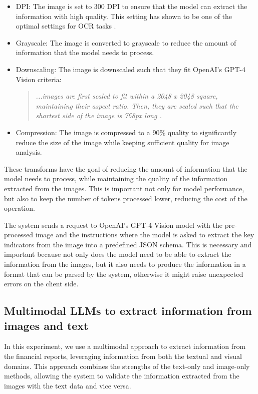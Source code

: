 \documentclass[english, 12pt, a4paper, elec, utf8, a-2b, online]{aaltothesis}
\begin{document}
\begin{itemize}
\label{list:image_transforms}
    \item DPI: The image is set to 300 DPI to ensure that the model can extract the information with high quality. This setting has shown to be one of the optimal settings for \ac{OCR} tasks \cite{ocr_preprocessing2007}.
    \item Grayscale: The image is converted to grayscale to reduce the amount of information that the model needs to process.
    \item Downscaling: The image is downscaled such that they fit OpenAI's \ac{GPT}-4 Vision criteria:
    \begin{quote}
        \textit{...images are first scaled to fit within a 2048 x 2048 square, maintaining their aspect ratio. Then, they are scaled such that the shortest side of the image is 768px long \cite{OpenAIVisionAPI}.}
    \end{quote}
    \item Compression: The image is compressed to a 90\% quality to significantly reduce the size of the image while keeping sufficient quality for image analysis.
\end{itemize}

These transforms have the goal of reducing the amount of information that the model needs to process, while maintaining the quality of the information extracted from the images.
This is important not only for model performance, but also to keep the number of tokens processed lower, reducing the cost of the operation.

The system sends a request to OpenAI's \ac{GPT}-4 Vision model with the pre-processed image and the instructions where the model is asked to extract the key indicators from the image into a predefined JSON schema.
This is necessary and important because not only does the model need to be able to extract the information from the images, but it also needs to produce the information in a format that can be parsed by the system, otherwise it might raise unexpected errors on the client side.

\subsection{Multimodal \ac{LLM}s to extract information from images and text}

In this experiment, we use a multimodal approach to extract information from the financial reports, leveraging information from both the textual and visual domains.
This approach combines the strengths of the text-only and image-only methods, allowing the system to validate the information extracted from the images with the text data and vice versa.
\end{document}
